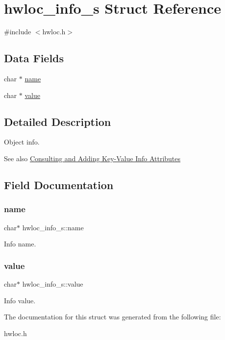 \hypertarget{a00286}{}\section{hwloc\+\_\+info\+\_\+s Struct Reference}
\label{a00286}


{\ttfamily \#include $<$hwloc.\+h$>$}

\subsection*{Data Fields}
\begin{DoxyCompactItemize}
\item 
char $\ast$ \hyperlink{a00286_a12ce1309e4381ae38b5c15d242a47124}{name}
\item 
char $\ast$ \hyperlink{a00286_a788a0073bafe660645e7b69f31a43bbb}{value}
\end{DoxyCompactItemize}


\subsection{Detailed Description}
Object info. 

\begin{DoxySeeAlso}{See also}
\hyperlink{a00189}{Consulting and Adding Key-\/\+Value Info Attributes} 
\end{DoxySeeAlso}


\subsection{Field Documentation}
\mbox{\label{a00286_a12ce1309e4381ae38b5c15d242a47124}} 
\subsubsection{\texorpdfstring{name}{name}}
{\footnotesize\ttfamily char$\ast$ hwloc\+\_\+info\+\_\+s\+::name}



Info name. 

\mbox{\label{a00286_a788a0073bafe660645e7b69f31a43bbb}} 
\subsubsection{\texorpdfstring{value}{value}}
{\footnotesize\ttfamily char$\ast$ hwloc\+\_\+info\+\_\+s\+::value}



Info value. 



The documentation for this struct was generated from the following file\+:\begin{DoxyCompactItemize}
\item 
hwloc.\+h\end{DoxyCompactItemize}
